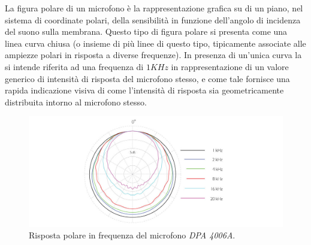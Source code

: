 La figura polare di un microfono è la rappresentazione grafica su di un piano,
nel sistema di coordinate polari, della sensibilità in funzione dell'angolo di
incidenza del suono sulla membrana. Questo tipo di figura polare si presenta
come una linea curva chiusa (o insieme di più linee di questo tipo, tipicamente
associate alle ampiezze polari in risposta a diverse frequenze). In presenza di
un’unica curva la si intende riferita ad una frequenza di $1KHz$ in rappresentazione
di un valore generico di intensità di risposta del microfono stesso,
e come tale fornisce una rapida indicazione visiva di come l'intensità di
risposta sia geometricamente distribuita intorno
al microfono stesso.

\begin{figure}[h]
\centering
\includegraphics[width=1\columnwidth]{CAPITOLI/1000/IMG/4006A-ddicate-4006A-Omni-Microphone-polar-pattern.jpg}
\caption{Risposta polare in frequenza del microfono \emph{DPA 4006A}.}%
\label{pol:dpa4006}
\end{figure}

